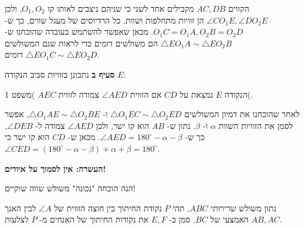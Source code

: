 \documentclass[12pt,a4paper]{article}
\begin{document}
הקווים 
$AC,DB$
מקבילים אחד לשני כי שניהם ניצבים לאותו קו
$O_1,O_2$,
ולכן 
$\angle C O_1 E, \angle D O_2 E$
הן זוויות מתחלפות ושוות. כל הרדיוסים של מעגל שווים, כך ש-%
$O_1C=O_1A, O_2B=O_2D$.
מכאן שאפשר להשתמש בעובדה שהוכחנו ש-%
$\triangle E O_1 A \sim \triangle E O_2 B$
הם משולשים דומים כדי לראות שגם המשולשים
$\triangle E O_1 C \sim \triangle E O_2 D$
דומים.

\textbf{סעיף ב}
נתבונן בזוויות סביב הנקודה
$E$:
\begin{center}
\end{center}
הנקודה
$E$
נמצאת על 
$CD$
אם הזווית 
$\angle AED$
צמודה לזווית
$AEC$
)משפט 1(.


לאחר שהוכחנו את דמיון המשולשים
$\triangle O_1 E C\sim \triangle O_2 E D$
ו-%
$\triangle O_1 A E \sim \triangle O_2 B E$,
אפשר לסמן את הזוויות השוות
$\alpha$
ו-%
$\beta$.
נתון ש-%
$AB$
הוא קו ישר, ולכן 
$\angle AED$
צמודה ל-%
$\angle DEB$,
כך ש-%
$\angle AED = 180^\circ - \alpha - \beta$.
מכאן ש-%
$CD$
הוא קו ישר כי
$\angle CED = (180^\circ - \alpha - \beta) + \alpha + \beta = 180^\circ$.


\begin{center}
\textbf{\large העשרה: אין לסמוך על איורים!}
\end{center}
הנה הוכחה "נכונה"
\textbf{}
משולש שווה שוקיים!

נתון משולש שרירותי 
$ABC$,
תהי
$P$
נקודת החיתוך בין חוצה הזווית של
$\angle A$
לבין האנך האמצעי של 
$BC$.
סמן ב-%
$E,F$
את נקודות החיתוך של האנחים מ-%
$P$
לצלעות
$AB,AC$.
\end{document}
